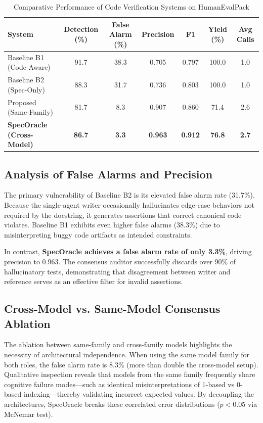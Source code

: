 \documentclass[conference]{IEEEtran}
\begin{document}
\begin{table}[t]
\centering
\caption{Comparative Performance of Code Verification Systems on HumanEvalPack}
\label{tab:main_results}
\begin{tabular}{lcccccc}
\toprule
\textbf{System} & \textbf{Detection (\%)} & \textbf{False Alarm (\%)} & \textbf{Precision} & \textbf{F1} & \textbf{Yield (\%)} & \textbf{Avg Calls} \\
\midrule
Baseline B1 (Code-Aware) & 91.7 & 38.3 & 0.705 & 0.797 & 100.0 & 1.0 \\
Baseline B2 (Spec-Only) & 88.3 & 31.7 & 0.736 & 0.803 & 100.0 & 1.0 \\
Proposed (Same-Family) & 81.7 & 8.3 & 0.907 & 0.860 & 71.4 & 2.6 \\
\textbf{SpecOracle (Cross-Model)} & \textbf{86.7} & \textbf{3.3} & \textbf{0.963} & \textbf{0.912} & \textbf{76.8} & \textbf{2.7} \\
\bottomrule
\end{tabular}
\end{table}

\subsection{Analysis of False Alarms and Precision}
The primary vulnerability of Baseline B2 is its elevated false alarm rate (31.7\%). Because the single-agent writer occasionally hallucinates edge-case behaviors not required by the docstring, it generates assertions that correct canonical code violates. Baseline B1 exhibits even higher false alarms (38.3\%) due to misinterpreting buggy code artifacts as intended constraints.

In contrast, \textbf{SpecOracle achieves a false alarm rate of only 3.3\%}, driving precision to 0.963. The consensus auditor successfully discards over 90\% of hallucinatory tests, demonstrating that disagreement between writer and reference serves as an effective filter for invalid assertions.

\subsection{Cross-Model vs. Same-Model Consensus Ablation}
The ablation between same-family and cross-family models highlights the necessity of architectural independence. When using the same model family for both roles, the false alarm rate is 8.3\% (more than double the cross-model setup). Qualitative inspection reveals that models from the same family frequently share cognitive failure modes—such as identical misinterpretations of 1-based vs 0-based indexing—thereby validating incorrect expected values. By decoupling the architectures, SpecOracle breaks these correlated error distributions ($p < 0.05$ via McNemar test).
\end{document}
